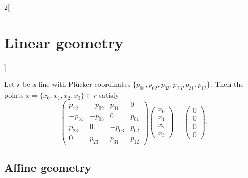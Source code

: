 \documentclass[class=article,10pt,crop=false]{standalone}
\begin{document}
\begin{multicols}{2}[\section{Linear geometry}]
\begin{prop}
\end{prop}
\begin{prop}
Let $r$ be a line with Plücker coordinates $\{p_{01},p_{02},p_{03},p_{23},p_{31},p_{12}\}$. Then the points $x=\{x_0,x_1,x_2,x_3\}\in r$ satisfy $$\begin{pmatrix}
p_{12} & -p_{02} & p_{01} & 0 \\
-p_{31} & -p_{03} & 0 & p_{01} \\
p_{23} & 0 & -p_{03} & p_{02} \\
0 & p_{23} & p_{31} & p_{12} 
\end{pmatrix}\begin{pmatrix}
x_0\\
x_1\\
x_2\\
x_3
\end{pmatrix}=\begin{pmatrix}
0\\
0\\
0\\
0
\end{pmatrix}.$$
\end{prop}
\subsection{Affine geometry}

\end{multicols}
\end{document}
